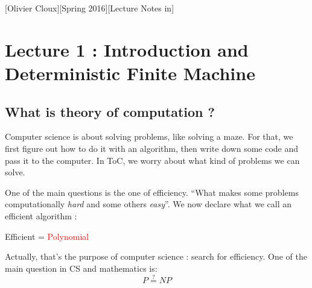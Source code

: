 \documentclass[12pt,a4paper]{article}
\newcommand{\<}{\langle}
\renewcommand{\>}{\rangle}
\begin{document}
[Olivier Cloux][Spring 2016][Lecture Notes in]
\newpage
\tableofcontents

\section{Lecture 1 : Introduction and Deterministic Finite Machine}
\subsection{What is theory of computation ?}
Computer science is about solving problems, like solving a maze. For that, we first figure out how to do it with an algorithm, then write down some code and pass it to the computer. In ToC, we worry about what kind of problems we can solve. 

One of the main questions is the one of efficiency. ``What makes some problems computationally \textit{hard} and some others \textit{easy}''. We now declare what we call an efficient algorithm :
\begin{boite}[0.3]
	\centering
	Efficient = \textcolor{red}{Polynomial}
\end{boite}
Actually, that's the purpose of computer science : search for efficiency. One of the main question in CS and mathematics is:
\[P \overset{?}{=} NP\]
\end{document}
